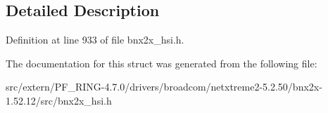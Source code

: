 \subsection{Detailed Description}


Definition at line 933 of file bnx2x\_\-hsi.h.



The documentation for this struct was generated from the following file:\begin{DoxyCompactItemize}
\item 
src/extern/PF\_\-RING-\/4.7.0/drivers/broadcom/netxtreme2-\/5.2.50/bnx2x-\/1.52.12/src/bnx2x\_\-hsi.h\end{DoxyCompactItemize}
